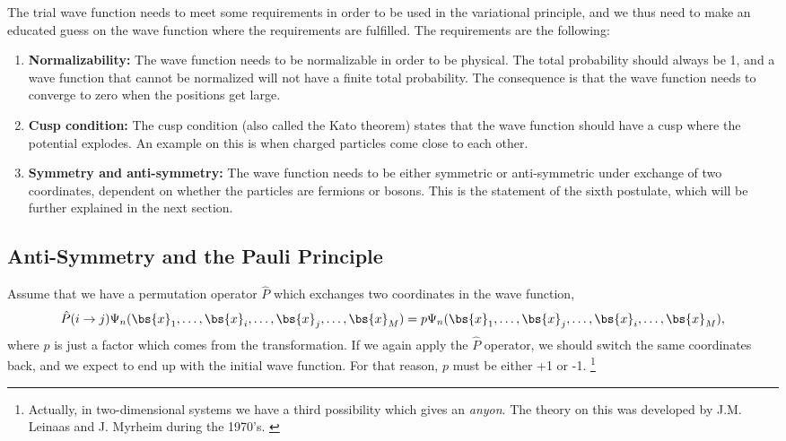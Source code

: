 The trial wave function needs to meet some requirements in order to be used in the variational principle, and we thus need to make an educated guess on the wave function where the requirements are fulfilled. The requirements are the following:

\begin{enumerate}
	\item \textbf{Normalizability:} The wave function needs to be normalizable in order to be physical. The total probability should always be 1, and a wave function that cannot be normalized will not have a finite total probability. The consequence is that the wave function needs to converge to zero when the positions get large. 
	
	\item \textbf{Cusp condition:} The cusp condition (also called the Kato theorem) states that the wave function should have a cusp where the potential explodes. An example on this is when charged particles come close to each other. 
	
	\item \textbf{Symmetry and anti-symmetry:} The wave function needs to be either symmetric or anti-symmetric under exchange of two coordinates, dependent on whether the particles are fermions or bosons. This is the statement of the sixth postulate, which will be further explained in the next section.
\end{enumerate}

\subsection{Anti-Symmetry and the Pauli Principle} \label{subsubsec:symmetry}
Assume that we have a permutation operator $\hat{P}$ which exchanges two coordinates in the wave function,
\begin{equation}
\hat{P}(i\rightarrow j)\Psi_n(\bs{x}_1,\hdots,\bs{x}_i,\hdots,\bs{x}_j,\hdots,\bs{x}_M)=p\Psi_n(\bs{x}_1,\hdots,\bs{x}_j,\hdots,\bs{x}_i,\hdots,\bs{x}_M),
\end{equation}
where $p$ is just a factor which comes from the transformation. If we again apply the $\hat{P}$ operator, we should switch the same coordinates back, and we expect to end up with the initial wave function. For that reason, $p$ must be either +1 or -1. \footnote{Actually, in two-dimensional systems we have a third possibility which gives an \textit{anyon}. The theory on this was developed by J.M. Leinaas and J. Myrheim during the 1970's. \cite{leinaas_one_1977}}

